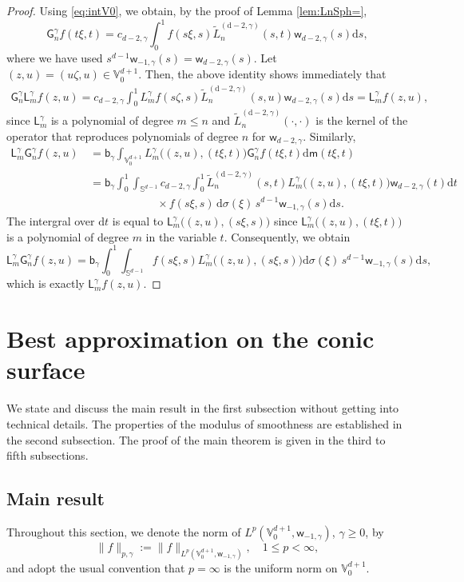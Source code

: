 \documentclass{amsart}
\theoremstyle{remark}
\def\d{\mathrm{d}}
\def\sph{{\mathbb{S}^{d-1}}}
\def\g{{\gamma}}
\def\s{\sigma}
\def\VV{{\mathbb V}}
\def\d{\mathrm{d}}
\def\sph{{\mathbb{S}^{d-1}}}
\def\sG{{\mathsf G}}
\def\sL{{\mathsf L}}
\def\sb{{\mathsf b}}
\def\sm{{\mathsf m}}
\def\sw{{\mathsf w}}
\def\g{{\gamma}}
\def\s{\sigma}
\def\VV{{\mathbb V}}
\newcommand{\wt}{\widetilde}
\begin{document}
\begin{proof}
Using \eqref{eq:intV0}, we obtain, by the proof of Lemma \ref{lem:LnSph=}, 
$$
    \sG_n^\g f(t\xi,t) = c_{d-2,\g} \int_0^1f(s\xi,s) \wt L_n^{(\d-2,\g)} (s,t) \sw_{d-2,\g}(s) \d s,
$$
where we have used $s^{d-1} \sw_{-1,\g}(s) = \sw_{d-2,\g}(s)$. Let $(z,u) = (u \zeta, u) \in \VV_0^{d+1}$. 
Then, the above identity shows immediately that 
\begin{align*}
  \sG_n^\g \sL_m^\g f(z, u)  = c_{d-2,\g} \int_0^1 L_m^\g f (s\zeta,s) \wt L_n^{(\d-2,\g)} (s,u) \sw_{d-2,\g}(s) \d s 
  = \sL_m^\g f(z, u),
\end{align*}
since $\sL_m^\g$ is a polynomial of degree $m \le n$ and $\wt L_n^{(\d-2,\g)} (\cdot,\cdot)$ is the 
kernel of the operator that reproduces polynomials of degree $n$ for $\sw_{d-2,\g}$. Similarly, 
\begin{align*}
  \sL_m^\g \sG_n^\g f(z, u) \, & = \sb_\g \int_{\VV_0^{d+1}} L_m^\g\big( (z,u), (t\xi,t)\big)  \sG_n^\g f(t\xi,t) \d \sm(t\xi,t) \\
       & = \sb_\g  \int_0^1 \int_{\sph} c_{d-2,\g} \int_0^1 \wt L_n^{(\d-2,\g)} (s,t) L_m^\g\big( (z,u), (t\xi,t)\big) \sw_{d-2,\g}(t) \d t\\
       & \qquad \qquad \qquad \times  f(s\xi,s)  \, \d \s(\xi) \, s^{d-1} \sw_{-1,\g}(s) \d s. 
\end{align*}
The intergral over $\d t$ is equal to $\sL_m^\g \big( (z,u), (s\xi,s)\big)$ since $\sL_m^\g\big( (z,u), (t\xi,t)\big)$ is a 
polynomial of degree $m$ in the variable $t$. Consequently, we obtain
$$
 \sL_m^\g \sG_n^\g f(z, u) = \sb_\g  \int_0^1 \int_{\sph} f(s\xi,s) L_m^\g\big( (z,u), (s\xi,s)\big)\d \s(\xi) \, s^{d-1} \sw_{-1,\g}(s) \d s,
$$ 
which is exactly $\sL_m^\g f(z,u)$.
\end{proof}

\section{Best approximation on the conic surface}
\setcounter{equation}{0}

We state and discuss the main result in the first subsection without getting into technical details.  
The properties of the modulus of smoothness are established in the second subsection. The proof of the
main theorem is given in the third to fifth subsections.

\subsection{Main result} 
Throughout this section, we denote the norm of $L^p(\VV_0^{d+1}, \sw_{-1,\g})$, $\g \ge 0$, by 
$$
   \| f\|_{p,\g} :=  \| f\|_{L^p(\VV_0^{d+1}, \sw_{-1,\g})}, \quad 1 \le p < \infty,
$$
and adopt the usual convention that $p=\infty$ is the uniform norm on $\VV_0^{d+1}$. 
\end{document}
